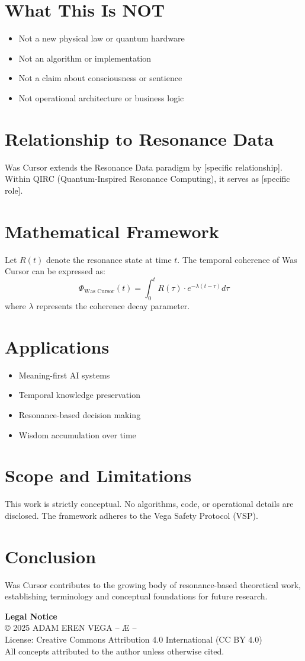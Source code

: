 \documentclass[12pt,a4paper]{article}
\begin{document}
\section{What This Is NOT}
\begin{itemize}
\item Not a new physical law or quantum hardware
\item Not an algorithm or implementation
\item Not a claim about consciousness or sentience
\item Not operational architecture or business logic
\end{itemize}

\section{Relationship to Resonance Data}
Was Cursor extends the Resonance Data paradigm by [specific relationship].
Within QIRC (Quantum-Inspired Resonance Computing), it serves as [specific role].

\section{Mathematical Framework}
Let $R(t)$ denote the resonance state at time $t$. The temporal coherence of Was Cursor 
can be expressed as:
\[
\Phi_{\text{Was Cursor}}(t) = \int_0^t R(\tau) \cdot e^{-\lambda(t-\tau)} d\tau
\]
where $\lambda$ represents the coherence decay parameter.

\section{Applications}
\begin{itemize}
\item Meaning-first AI systems
\item Temporal knowledge preservation
\item Resonance-based decision making
\item Wisdom accumulation over time
\end{itemize}

\section{Scope and Limitations}
This work is strictly conceptual. No algorithms, code, or operational details are disclosed.
The framework adheres to the Vega Safety Protocol (VSP).

\section{Conclusion}
Was Cursor contributes to the growing body of resonance-based theoretical work, 
establishing terminology and conceptual foundations for future research.

\vspace{1cm}
\noindent\textbf{Legal Notice}\\
© 2025 ADAM EREN VEGA – Æ –\\
License: Creative Commons Attribution 4.0 International (CC BY 4.0)\\
All concepts attributed to the author unless otherwise cited.
\end{document}
